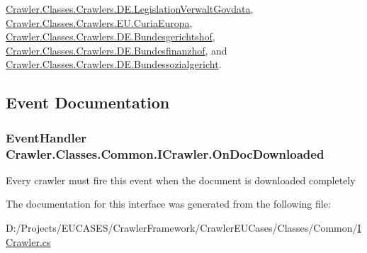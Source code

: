 \hyperlink{class_crawler_1_1_classes_1_1_crawlers_1_1_d_e_1_1_legislation_verwalt_govdata_a5eecceedce63ecae49d8a19b810d578a}{Crawler.\-Classes.\-Crawlers.\-D\-E.\-Legislation\-Verwalt\-Govdata}, \hyperlink{class_crawler_1_1_classes_1_1_crawlers_1_1_e_u_1_1_curia_europa_a4b2e192e6a1ffeefd1c0b1dac642324f}{Crawler.\-Classes.\-Crawlers.\-E\-U.\-Curia\-Europa}, \hyperlink{class_crawler_1_1_classes_1_1_crawlers_1_1_d_e_1_1_bundesgerichtshof_a22394430f7cfb0ea4da214037fe61703}{Crawler.\-Classes.\-Crawlers.\-D\-E.\-Bundesgerichtshof}, \hyperlink{class_crawler_1_1_classes_1_1_crawlers_1_1_d_e_1_1_bundesfinanzhof_ad603e762fc8e22e2c86a027889fbf004}{Crawler.\-Classes.\-Crawlers.\-D\-E.\-Bundesfinanzhof}, and \hyperlink{class_crawler_1_1_classes_1_1_crawlers_1_1_d_e_1_1_bundessozialgericht_a629080a4171a5b06a46b05cfc8296d95}{Crawler.\-Classes.\-Crawlers.\-D\-E.\-Bundessozialgericht}.



\subsection{Event Documentation}
\hypertarget{interface_crawler_1_1_classes_1_1_common_1_1_i_crawler_a0ee889da4786e045dfe9c55ac3733687}{
\subsubsection[{On\-Doc\-Downloaded}]{\setlength{\rightskip}{0pt plus 5cm}Event\-Handler Crawler.\-Classes.\-Common.\-I\-Crawler.\-On\-Doc\-Downloaded}}\label{interface_crawler_1_1_classes_1_1_common_1_1_i_crawler_a0ee889da4786e045dfe9c55ac3733687}


Every crawler must fire this event when the document is downloaded completely 



The documentation for this interface was generated from the following file\-:\begin{DoxyCompactItemize}
\item 
D\-:/\-Projects/\-E\-U\-C\-A\-S\-E\-S/\-Crawler\-Framework/\-Crawler\-E\-U\-Cases/\-Classes/\-Common/\hyperlink{_i_crawler_8cs}{I\-Crawler.\-cs}\end{DoxyCompactItemize}
